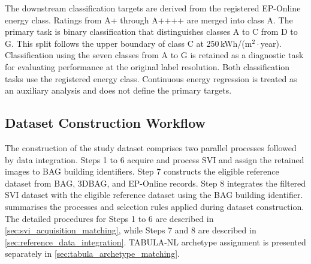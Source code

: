 The downstream classification targets are derived from the registered EP-Online energy class.
Ratings from A+ through A++++ are merged into class A.
The primary task is binary classification that distinguishes classes A to C from D to G.
This split follows the upper boundary of class C at 250\,kWh/(m$^2\cdot$year).
Classification using the seven classes from A to G is retained as a diagnostic task for evaluating performance at the original label resolution.
Both classification tasks use the registered energy class.
Continuous energy regression is treated as an auxiliary analysis and does not define the primary targets.

\subsection{Dataset Construction Workflow}
\label{sec:svi_acquisition_filtering}

The construction of the study dataset comprises two parallel processes followed by data integration.
Steps 1 to 6 acquire and process \ac{SVI} and assign the retained images to BAG building identifiers.
Step 7 constructs the eligible reference dataset from BAG, 3DBAG, and EP-Online records.
Step 8 integrates the filtered \ac{SVI} dataset with the eligible reference dataset using the BAG building identifier.
 summarises the processes and selection rules applied during dataset construction.
The detailed procedures for Steps 1 to 6 are described in \cref{sec:svi_acquisition_matching}, while Steps 7 and 8 are described in \cref{sec:reference_data_integration}.
TABULA-NL archetype assignment is presented separately in \cref{sec:tabula_archetype_matching}.

